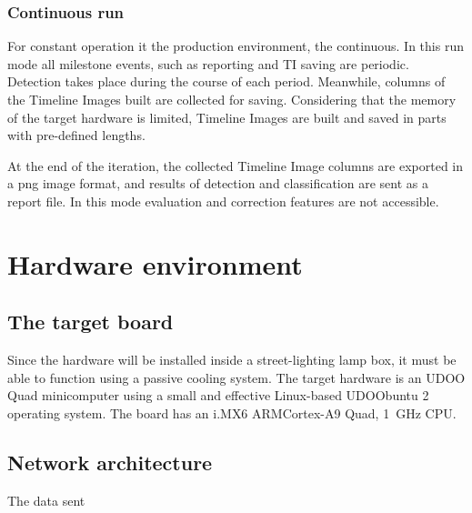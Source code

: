 \subsubsection{Continuous run}
For constant operation it the production environment, the continuous.
In this run mode all milestone events, such as reporting and TI saving are periodic. 
Detection takes place during the course of each period. 
Meanwhile, columns of the Timeline Images built are collected for saving.
Considering that the memory of the target hardware is limited, Timeline Images are built and saved in parts with pre-defined lengths.

At the end of the iteration, the collected Timeline Image columns are exported in a png image format, and results of detection and classification are sent as a report file.
In this mode evaluation and correction features are not accessible.
\section{Hardware environment}
\subsection{The target board}
Since the hardware will be installed inside a street-lighting lamp box, it must be able to function using a passive cooling system.
The target hardware is an UDOO Quad minicomputer using a small and effective Linux-based UDOObuntu 2 operating system.
The board has an i.MX6 ARM\reg Cortex\reg-A9 Quad, \SI{1}{GHz} CPU.

\subsection{Network architecture}
The data sent



